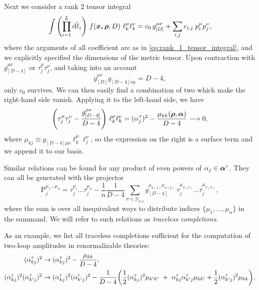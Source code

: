 Next we consider a rank 2 tensor integral
\begin{equation}
  \int \qty(\prod_{i=1}^{L} \tilde{\dd{\ell_i}}){}~ f(\vb*{\vb*{x},\vb*{\rho}},D) ~ \ell_k^{\mu}\ell_k^{\nu} = c_0\,g^{\mu\nu}_{[D]} + \sum_{i,j}^{}c_{i,j}\;p^\mu_i p^\nu_j,
\end{equation}
where the arguments of all coefficient are as in \cref{eq:rank_1_tensor_integral}, and we explicitly specified the dimensions of the metric tensor.
Upon contraction with $g^{\mu\nu}_{[D-4]}$ or $\tau_j^\mu\tau_j^\nu$, and taking into an account
\[
  g^{\mu\nu}_{[D]}g^{\phantom{\mu\nu}}_{[D-4]\nu\mu} = D-4,
\]
only $c_0$ survives.
We can then easily find a combination of two which make the right-hand side vanish. Applying it to the left-hand side, we have
\begin{equation}
  \qty(\tau_j^\mu\tau_j^\nu - \frac{g^{\mu\nu}_{[D-4]}}{D-4}) ~ \ell_k^{\mu}\ell_k^{\nu} = (\alpha_j^\tau)^2 - \frac{\mu_{kk}(\vb*{\rho},\vb*{\alpha})}{D-4} \longrightarrow 0,
\end{equation}
where $\mu_{kj} \equiv g^{\phantom{\mu\nu}}_{[D-4]\mu\nu} \ell_k^\mu \ell_j^\nu$, so the expression on the right is a surface term and
we append it to our basis.


Similar relations can be found for any product of even powers of $\alpha_j \in \vb*{\alpha}^\tau$.
They can all be generated with the projector
\begin{equation}
  \mathrm{P}^{\mu_1\ldots{}\mu_n}_j =  \tau^{\mu_i}_j\ldots{}\tau^{\mu_n}_j - \frac{1}{n}\frac{1}{D-4} \sum_{\sigma \in \mathcal{G}_{2;n}}^{} g^{\mu_{\sigma(1)}\mu_{\sigma(2)}}_{[D-4]}~\tau^{\mu_{\sigma(3)}}_j\ldots{}\tau^{\mu_{\sigma(n)}}_j,
\end{equation}
where the sum is over all inequivalent ways to distribute indices $\{\mu_1,\ldots{},\mu_n\}$ in the summand.
We will refer to such relations as \emph{traceless completions}.

As an example, we list all traceless completions sufficient for the computation of two-loop amplitudes in renormalizable theories:
\begin{align} \label{eq:traceless_completion_replacements}
  (\alpha_{kj}^{\tau})^2 &\to (\alpha_{kj}^{\tau})^2 - \frac{\mu_{kk}}{D-4}, \\
  \nonumber
  (\alpha_{kj}^{\tau})^2(\alpha_{k^\prime j}^{\tau})^2 &\to
  (\alpha_{kj}^{\tau})^2(\alpha_{k^\prime j}^{\tau})^2 - \frac{1}{D-4} \qty(
    \frac{1}{2}(\alpha_{kj}^{\tau})^2 \mu_{k^\prime k^\prime} ~+~ \alpha_{kj}^{\tau}\alpha_{k^\prime j}^{\tau} \mu_{k k^\prime} + \frac{1}{2}(\alpha_{k^\prime j}^{\tau})^2 \mu_{k k}
  ).
\end{align}


